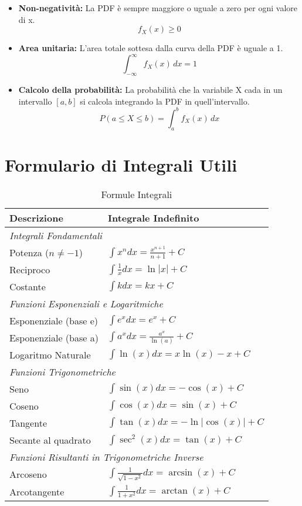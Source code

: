 \begin{itemize}
    \item \textbf{Non-negatività:} La PDF è sempre maggiore o uguale a zero per ogni valore di x.
    $$ f_X(x) \ge 0 $$
    
    \item \textbf{Area unitaria:} L'area totale sottesa dalla curva della PDF è uguale a 1.
    $$ \int_{-\infty}^{\infty} f_X(x) \,dx = 1 $$
    
    \item \textbf{Calcolo della probabilità:} La probabilità che la variabile X cada in un intervallo $[a, b]$ si calcola integrando la PDF in quell'intervallo.
    $$ P(a \le X \le b) = \int_{a}^{b} f_X(x) \,dx $$
\end{itemize}

\section{Formulario di Integrali Utili}

\begin{table}[h!]
\centering
\caption{Formule Integrali}
\label{tab:integrals}
\begin{tabular}{ll}
    \toprule
    \textbf{Descrizione} & \textbf{Integrale Indefinito} \\
    \midrule
    \multicolumn{2}{l}{\textit{Integrali Fondamentali}} \\
    Potenza ($n \neq -1$) & $\int x^n dx = \frac{x^{n+1}}{n+1} + C$ \\
    Reciproco & $\int \frac{1}{x} dx = \ln|x| + C$ \\
    Costante & $\int k dx = kx + C$ \\
    \midrule
    \multicolumn{2}{l}{\textit{Funzioni Esponenziali e Logaritmiche}} \\
    Esponenziale (base e) & $\int e^x dx = e^x + C$ \\
    Esponenziale (base a) & $\int a^x dx = \frac{a^x}{\ln(a)} + C$ \\
    Logaritmo Naturale & $\int \ln(x) dx = x\ln(x) - x + C$ \\
    \midrule
    \multicolumn{2}{l}{\textit{Funzioni Trigonometriche}} \\
    Seno & $\int \sin(x) dx = -\cos(x) + C$ \\
    Coseno & $\int \cos(x) dx = \sin(x) + C$ \\
    Tangente & $\int \tan(x) dx = -\ln|\cos(x)| + C$ \\
    Secante al quadrato & $\int \sec^2(x) dx = \tan(x) + C$ \\
    \midrule
    \multicolumn{2}{l}{\textit{Funzioni Risultanti in Trigonometriche Inverse}} \\
    Arcoseno & $\int \frac{1}{\sqrt{1-x^2}} dx = \arcsin(x) + C$ \\
    Arcotangente & $\int \frac{1}{1+x^2} dx = \arctan(x) + C$ \\
    \bottomrule
\end{tabular}
\end{table}